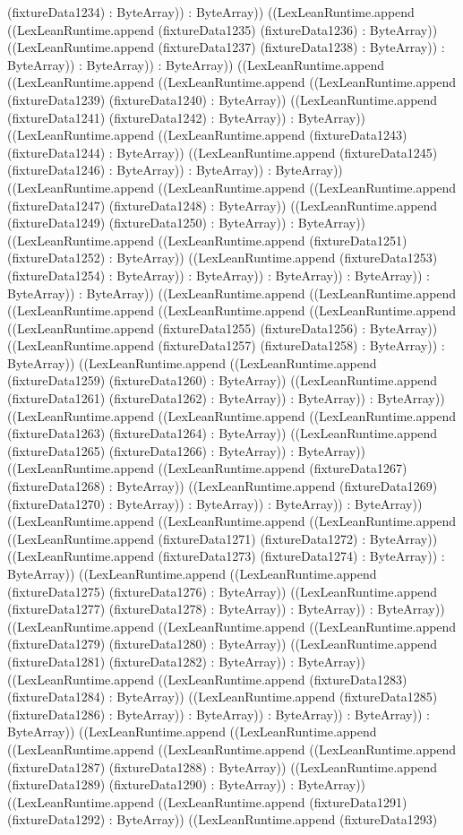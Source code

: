 \documentclass[11pt]{article}
\begin{document}
(fixtureData1234) : ByteArray)) : ByteArray)) ((LexLeanRuntime.append ((LexLeanRuntime.append (fixtureData1235) (fixtureData1236) : ByteArray)) ((LexLeanRuntime.append (fixtureData1237) (fixtureData1238) : ByteArray)) : ByteArray)) : ByteArray)) : ByteArray)) ((LexLeanRuntime.append ((LexLeanRuntime.append ((LexLeanRuntime.append ((LexLeanRuntime.append (fixtureData1239) (fixtureData1240) : ByteArray)) ((LexLeanRuntime.append (fixtureData1241) (fixtureData1242) : ByteArray)) : ByteArray)) ((LexLeanRuntime.append ((LexLeanRuntime.append (fixtureData1243) (fixtureData1244) : ByteArray)) ((LexLeanRuntime.append (fixtureData1245) (fixtureData1246) : ByteArray)) : ByteArray)) : ByteArray)) ((LexLeanRuntime.append ((LexLeanRuntime.append ((LexLeanRuntime.append (fixtureData1247) (fixtureData1248) : ByteArray)) ((LexLeanRuntime.append (fixtureData1249) (fixtureData1250) : ByteArray)) : ByteArray)) ((LexLeanRuntime.append ((LexLeanRuntime.append (fixtureData1251) (fixtureData1252) : ByteArray)) ((LexLeanRuntime.append (fixtureData1253) (fixtureData1254) : ByteArray)) : ByteArray)) : ByteArray)) : ByteArray)) : ByteArray)) : ByteArray)) ((LexLeanRuntime.append ((LexLeanRuntime.append ((LexLeanRuntime.append ((LexLeanRuntime.append ((LexLeanRuntime.append ((LexLeanRuntime.append (fixtureData1255) (fixtureData1256) : ByteArray)) ((LexLeanRuntime.append (fixtureData1257) (fixtureData1258) : ByteArray)) : ByteArray)) ((LexLeanRuntime.append ((LexLeanRuntime.append (fixtureData1259) (fixtureData1260) : ByteArray)) ((LexLeanRuntime.append (fixtureData1261) (fixtureData1262) : ByteArray)) : ByteArray)) : ByteArray)) ((LexLeanRuntime.append ((LexLeanRuntime.append ((LexLeanRuntime.append (fixtureData1263) (fixtureData1264) : ByteArray)) ((LexLeanRuntime.append (fixtureData1265) (fixtureData1266) : ByteArray)) : ByteArray)) ((LexLeanRuntime.append ((LexLeanRuntime.append (fixtureData1267) (fixtureData1268) : ByteArray)) ((LexLeanRuntime.append (fixtureData1269) (fixtureData1270) : ByteArray)) : ByteArray)) : ByteArray)) : ByteArray)) ((LexLeanRuntime.append ((LexLeanRuntime.append ((LexLeanRuntime.append ((LexLeanRuntime.append (fixtureData1271) (fixtureData1272) : ByteArray)) ((LexLeanRuntime.append (fixtureData1273) (fixtureData1274) : ByteArray)) : ByteArray)) ((LexLeanRuntime.append ((LexLeanRuntime.append (fixtureData1275) (fixtureData1276) : ByteArray)) ((LexLeanRuntime.append (fixtureData1277) (fixtureData1278) : ByteArray)) : ByteArray)) : ByteArray)) ((LexLeanRuntime.append ((LexLeanRuntime.append ((LexLeanRuntime.append (fixtureData1279) (fixtureData1280) : ByteArray)) ((LexLeanRuntime.append (fixtureData1281) (fixtureData1282) : ByteArray)) : ByteArray)) ((LexLeanRuntime.append ((LexLeanRuntime.append (fixtureData1283) (fixtureData1284) : ByteArray)) ((LexLeanRuntime.append (fixtureData1285) (fixtureData1286) : ByteArray)) : ByteArray)) : ByteArray)) : ByteArray)) : ByteArray)) ((LexLeanRuntime.append ((LexLeanRuntime.append ((LexLeanRuntime.append ((LexLeanRuntime.append ((LexLeanRuntime.append (fixtureData1287) (fixtureData1288) : ByteArray)) ((LexLeanRuntime.append (fixtureData1289) (fixtureData1290) : ByteArray)) : ByteArray)) ((LexLeanRuntime.append ((LexLeanRuntime.append (fixtureData1291) (fixtureData1292) : ByteArray)) ((LexLeanRuntime.append (fixtureData1293) 
\end{document}
